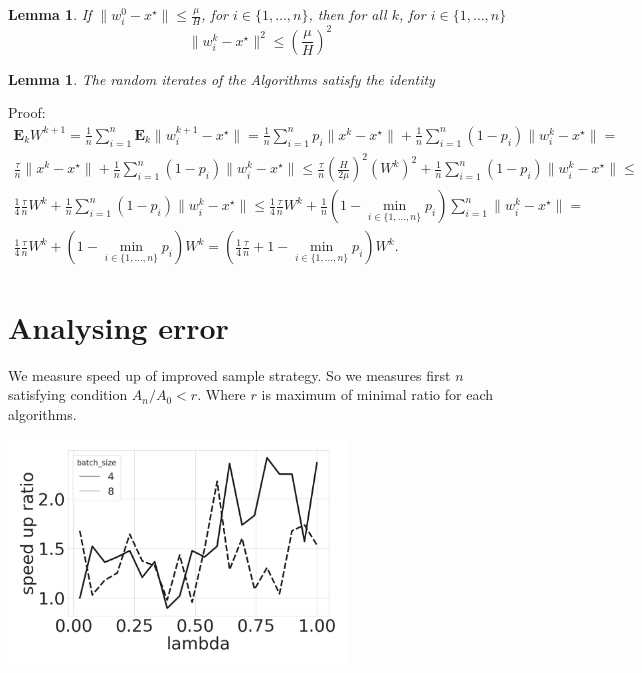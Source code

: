 \documentclass{article}
\newtheorem{lemma}[theorem]{Lemma}
\begin{document}
\begin{lemma}
If $\|w_i^0 - x^\star\| \leq \frac{\mu}{H}$, for $i \in \{1, \dots, n\}$, then for all $k$, for $i \in \{1, \dots, n\}$
\begin{equation}
    \|w_i^k - x^\star\|^2 \leq \left(\frac{\mu}{H}\right)^2
\end{equation}
\end{lemma}

\begin{lemma} The random iterates of the Algorithms satisfy the identity
\end{lemma}
Proof:
\begin{equation*}
\begin{split}
    \mathbf{E}_k W^{k + 1} = \frac{1}{n}\sum\limits_{i=1}^{n}\mathbf{E}_k\|w_i^{k + 1} - x^\star\| =
     \frac{1}{n}\sum\limits_{i=1}^{n}p_i\|x^k - x^\star\| + \frac{1}{n}\sum\limits_{i=1}^{n}(1 - p_i)\|w_i^k - x^\star\| = \\
     \frac{\tau}{n}\|x^k - x^\star\| + \frac{1}{n}\sum\limits_{i=1}^{n}(1 - p_i)\|w_i^k - x^\star\| \leq
     \frac{\tau}{n}\left(\frac{H}{2\mu}\right)^2\left(W^k\right)^2 + \frac{1}{n}\sum\limits_{i=1}^{n}(1 - p_i)\|w_i^k - x^\star\| \leq \\
     \frac{1}{4}\frac{\tau}{n}W^k + \frac{1}{n}\sum\limits_{i=1}^{n}(1 - p_i)\|w_i^k - x^\star\| \leq \frac{1}{4}\frac{\tau}{n}W^k + \frac{1}{n}(1 - \min_{i \in \{1, \dots, n\}}{p_i})\sum\limits_{i=1}^{n}\|w_i^k - x^\star\|  = \\ \frac{1}{4}\frac{\tau}{n}W^k + (1 - \min_{i \in \{1, \dots, n\}}{p_i})W^k =  \left(\frac{1}{4}\frac{\tau}{n} + 1 - \min_{i \in \{1, \dots, n\}}{p_i}\right)W^k.
\end{split}
\end{equation*}

\section{Analysing error}

We measure speed up of improved sample strategy. So we measures first $n$ satisfying condition $A_n/A_0 < r$.
Where $r$ is maximum of minimal ratio for each algorithms.

\includegraphics[width=90mm]{speed_lambda.png}
\end{document}

